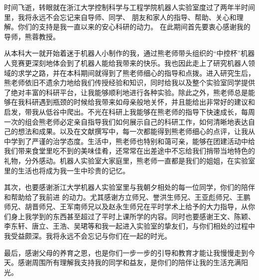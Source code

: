 \begin{thanks}
时间飞逝，转眼就在浙江大学控制科学与工程学院机器人实验室度过了两年半时间里，我将永远不会忘记来自导师、同学、 朋友和家人的指导、帮助、关心和理解。你们的支持是我一直以来的安心科研的动力。
在此期间首先要衷心感谢我的导师，熊蓉教授。

从本科大一就开始着迷于机器人小制作的我，通过熊老师带头组织的“中控杯”机器人竞赛更深刻地体会到了机器人能给我带来的快乐。我也因此走上了研究机器人领域的求学之路，并在本科期间就得到了熊老师细心的指导和点拨。进入研究生后，熊老师依旧不遗余力地给我们传授经验和知识，同时给我以及整个实验室同学提供了绝对丰富的科研平台，让我能够顺利地进行各种实验。除此之外，熊老师总是能够在我科研遇到瓶颈的时候给我带来如母亲般地关怀，并且能给出非常好的建议和启发，带我从低谷中爬出。不光在科研上我能够在熊老师的指导下快速成长，每周一次的组会熊老师必定亲自指导我们如何展示自己的科研工作，如何清晰地表达自己的想法和成果。以及在文献撰写中，每一次都能得到熊老师细心的点评，让我从中学到了严谨的治学态度。生活中，熊老师也特别和蔼可亲，能够在团建活动中给我们带来食堂里吃不到的美味佳肴，还常常在出差途中不忘给我们捎带当地特色的礼物，分外感动。机器人实验室大家庭里，熊老师一直都是我们的姐姐，在实验室里的生活也将成为我一生中珍贵的记忆。

其次，也要感谢浙江大学机器人实验室里与我朝夕相处的每一位同学，你们的陪伴和帮助给了我前进 的动力。尤其感谢方立师兄、誉洪生师兄、王亚彪师兄、王鹏师兄、胡晋师兄、王军南师兄以及赵永生师兄在平时学术上给予的大力指导，从你们身上我学到的东西甚至超过了平时上课所学的内容。同时也要感谢王文、陈颖、李东轩、唐立、王浩、吴珺等和我一起进入实验室的挚友们，与你们相处的过程中我受益颇深。我将永远不会忘记与你们在一起的时光。

最后，感谢父母的养育之恩，也是你们一步一步的引导和教育才能让我慢慢走到今天。感谢周围所有理解我支持我的同学和益友，是你们的陪伴让我的生活充满阳光。

\end{thanks}
